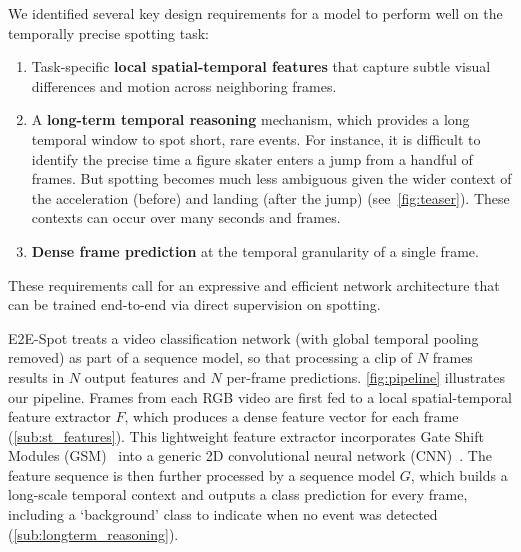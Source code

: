 \documentclass[runningheads]{llncs}
\newcommand{\notation}[1]{\ensuremath{#1}\xspace}
\newcommand{\OURMETHOD}{{E2E-Spot}\xspace}
\newcommand{\NumFrames}{\notation{N}}
\newcommand{\FeatureExtractor}{\notation{F}}
\newcommand{\TemporalArchitecture}{\notation{G}}
\begin{document}
We identified several key design requirements for a model to
perform well on the temporally precise spotting task:
\begin{enumerate}
    \item Task-specific {\bf local spatial-temporal features} that capture subtle visual differences and motion across neighboring frames.

    \item A {\bf long-term temporal reasoning} mechanism, which
    provides a long temporal window to spot short, rare events.
For instance, it is difficult to identify the precise time a figure skater
    enters a jump from a handful of frames.
But spotting becomes much less ambiguous given the wider context of the acceleration (before) and landing (after the jump) (see~\autoref{fig:teaser}).
These contexts can occur over many seconds and frames.

    \item {\bf Dense frame prediction} at the temporal granularity of a single frame.

\end{enumerate}
These requirements call for an expressive and efficient network architecture that can be trained end-to-end via direct supervision on spotting.

\OURMETHOD treats a video classification network (with global temporal pooling removed) as part of a sequence model, so that processing a clip of \NumFrames frames results in \NumFrames output features and \NumFrames per-frame predictions.
\autoref{fig:pipeline} illustrates our pipeline.
Frames from each RGB video are first fed to a local spatial-temporal
feature extractor \FeatureExtractor, which produces a dense feature vector
for each frame (\autoref{sub:st_features}).
This lightweight feature extractor incorporates Gate Shift Modules (GSM)~\cite{gsm} into a
generic 2D convolutional neural network (CNN)~\cite{regnet}.
The feature sequence is then further processed by a sequence model
\TemporalArchitecture, which builds a long-scale temporal context
and outputs a class prediction for every frame, including a `background' class to indicate when no event was detected (\autoref{sub:longterm_reasoning}).
\end{document}
